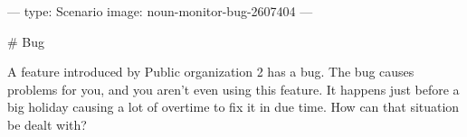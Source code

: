 ---
type: Scenario
image: noun-monitor-bug-2607404
---

# Bug

A feature introduced by Public organization 2 has a bug. The bug causes problems for you, and you aren't even using this feature. It happens just before a big holiday causing a lot of overtime to fix it in due time. How can that situation be dealt with?
